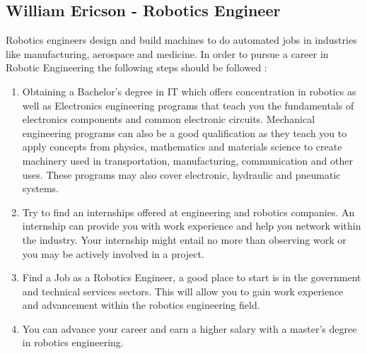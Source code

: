 \documentclass[11pt, oneside, a4paper, titlepage]{article}
\begin{document}
\subsection{William Ericson - Robotics Engineer }
Robotics engineers design and build machines to do automated jobs in industries like manufacturing, aerospace and medicine. In order to pursue a career in Robotic Engineering the following steps should be followed : 
\begin{enumerate}
	\item
    Obtaining a Bachelor's degree in IT which offers concentration in robotics as well as Electronics engineering programs that teach you the fundamentals of electronics components and common electronic circuits. Mechanical engineering programs can also be a good qualification as they teach you to apply concepts from physics, mathematics and materials science to create machinery used in transportation, manufacturing, communication and other uses. These programs may also cover electronic, hydraulic and pneumatic systems.  
	\item
    Try to find an internships offered at engineering and robotics companies. An internship can provide you with work experience and help you network within the industry. Your internship might entail no more than observing work or you may be actively involved in a project. 
	\item
    Find a Job as a Robotics Engineer, a good place to start is in the government and technical services sectors. This will allow you to gain work experience and advancement within the robotics engineering field.  
	\item
    You can advance your career and earn a higher salary with a master's degree in robotics engineering. 
\end{enumerate}
\end{document}
